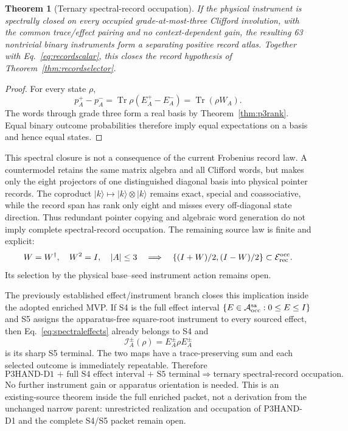 \documentclass[11pt]{article}
\newtheorem{theorem}{Theorem}
\newcommand{\Tr}{\operatorname{Tr}}
\begin{document}
\begin{theorem}[Ternary spectral-record occupation]
\label{thm:spectraloccupation}
If the physical instrument is spectrally closed on every occupied
grade-at-most-three Clifford involution, with the common trace/effect pairing
and no context-dependent gain, the resulting 63 nontrivial binary instruments
form a separating positive record atlas. Together with
Eq.~\eqref{eq:recordscalar}, this closes the record hypothesis of
Theorem~\ref{thm:recordselector}.
\end{theorem}

\begin{proof}
For every state $\rho$,
\begin{equation}
 p_A^+-p_A^-
 =\Tr\rho(E_A^+-E_A^-)=\Tr(\rho W_A).
\end{equation}
The words through grade three form a real basis by
Theorem~\ref{thm:p3rank}. Equal binary outcome probabilities therefore imply
equal expectations on a basis and hence equal states.
\end{proof}

This spectral closure is not a consequence of the current Frobenius record
law. A countermodel retains the same matrix algebra and all Clifford words,
but makes only the eight projectors of one distinguished diagonal basis into
physical pointer records. The coproduct
$|k\rangle\mapsto|k\rangle\otimes|k\rangle$ remains exact, special and
coassociative, while the record span has rank only eight and misses every
off-diagonal state direction. Thus redundant pointer copying and algebraic
word generation do not imply complete spectral-record occupation. The
remaining source law is finite and explicit:
\begin{equation}
 W=W^\dagger,\quad W^2=I,\quad |A|\leq3
 \quad\Longrightarrow\quad
 \{(I+W)/2,(I-W)/2\}\subset\mathcal E_{\rm rec}^{\rm occ}.
 \label{eq:spectralclosure}
\end{equation}
Its selection by the physical base--seed instrument action remains open.

The previously established effect/instrument branch closes this implication
inside the adopted enriched MVP. If S4 is the full effect interval
$\{E\in\mathcal A_{\rm occ}^{\rm sa}:0\leq E\leq I\}$ and S5 assigns the
apparatus-free square-root instrument to every sourced effect, then
Eq.~\eqref{eq:spectraleffects} already belongs to S4 and
\begin{equation}
 \mathcal I_A^\pm(\rho)=E_A^\pm\rho E_A^\pm
 \label{eq:luders}
\end{equation}
is its sharp S5 terminal. The two maps have a trace-preserving sum and each
selected outcome is immediately repeatable. Therefore
\begin{equation}
 \boxed{\text{P3HAND-D1 + full S4 effect interval + S5 terminal}
 \Longrightarrow\text{ternary spectral-record occupation}.}
 \label{eq:existingspectral}
\end{equation}
No further instrument gain or apparatus orientation is needed. This is an
existing-source theorem inside the full enriched packet, not a derivation
from the unchanged narrow parent: unrestricted realization and occupation of
P3HAND-D1 and the complete S4/S5 packet remain open.
\end{document}

